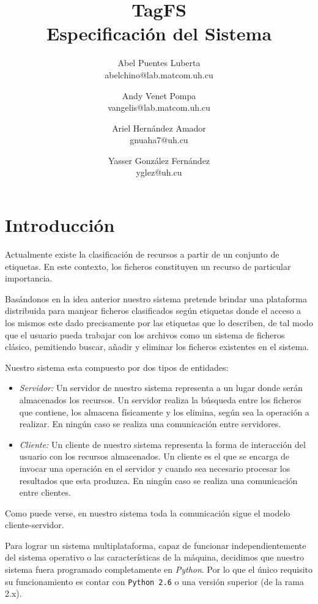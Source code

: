 \documentclass{article}
\title{
	\LARGE{TagFS} \\
	\Large{Especificación del Sistema}
}
\author{
  	Abel Puentes Luberta \\
  	\small{abelchino@lab.matcom.uh.cu}
  	\and
  	Andy Venet Pompa \\
  	\small{vangelis@lab.matcom.uh.cu}
  	\and
  	Ariel Hernández Amador \\
  	\small{gnuaha7@uh.cu}
  	\and
  	Yasser González Fernández \\
  	\small{yglez@uh.cu} 	
}
\date{}
\begin{document}
\maketitle

\thispagestyle{empty}

\newpage

\setcounter{page}{1}

\section{Introducción}

Actualmente existe la clasificación de recursos a partir de un conjunto de 
etiquetas. En este contexto, los ficheros constituyen un recurso de particular 
importancia. 

Basándonos en la idea anterior nuestro sistema pretende brindar una plataforma
distribuida para manjear ficheros clasificados según etiquetas donde el acceso
a los mismos este dado precisamente por las etiquetas que lo describen, de tal
modo que el usuario pueda trabajar con los archivos como un sistema de ficheros
clásico, pemitiendo buscar, añadir y eliminar los ficheros existentes en el
sistema.

Nuestro sistema esta compuesto por dos tipos de entidades:
\begin{itemize}
  \item \emph{Servidor:} Un servidor de nuestro sistema representa a un lugar
  donde serán almacenados los recursos. Un servidor realiza la búsqueda entre
  los ficheros que contiene, los almacena físicamente y los elimina, según sea
  la operación a realizar. En ningún caso se realiza una comunicación entre
  servidores.
  \item \emph{Cliente:} Un cliente de nuestro sistema representa la forma de
  interacción del usuario con los recursos almacenados. Un cliente es el que se
  encarga de invocar una operación en el servidor y cuando sea necesario
  procesar los resultados que esta produzca. En ningún caso se realiza una
  comunicación entre clientes.
\end{itemize}

Como puede verse, en nuestro sistema toda la comunicación sigue el modelo
cliente-servidor.

Para lograr un sistema multiplataforma, capaz de funcionar independientemente
del sistema operativo o las características de la máquina, decidimos que nuestro
sistema fuera programado completamente en \emph{Python}. Por lo que el único
requisito su funcionamiento es contar con \verb|Python 2.6| o una versión
superior (de la rama 2.x).
\end{document}
